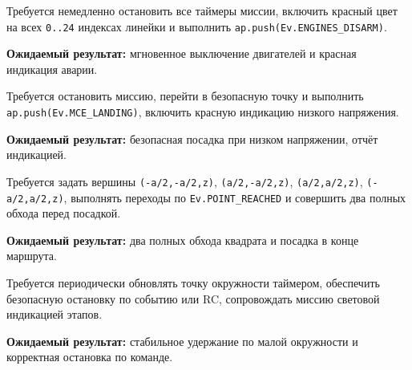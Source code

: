 \begin{taskbox}
Требуется немедленно остановить все таймеры миссии, включить красный цвет на всех \texttt{0..24} индексах линейки и выполнить \texttt{ap.push(Ev.ENGINES\_DISARM)}.

\textbf{Ожидаемый результат:} мгновенное выключение двигателей и красная индикация аварии.
\end{taskbox}

\begin{taskbox}
Требуется остановить миссию, перейти в безопасную точку и выполнить \texttt{ap.push(Ev.MCE\_LANDING)}, включить красную индикацию низкого напряжения.

\textbf{Ожидаемый результат:} безопасная посадка при низком напряжении, отчёт индикацией.
\end{taskbox}

\begin{taskbox}
Требуется задать вершины \texttt{(-a/2,-a/2,z)}, \texttt{(a/2,-a/2,z)}, \texttt{(a/2,a/2,z)}, \texttt{(-a/2,a/2,z)}, выполнять переходы по \texttt{Ev.POINT\_REACHED} и совершить два полных обхода перед посадкой.

\textbf{Ожидаемый результат:} два полных обхода квадрата и посадка в конце маршрута.
\end{taskbox}

\begin{taskbox}[«Лоитер» по малой окружности \texttt{r=0.2}]
Требуется периодически обновлять точку окружности таймером, обеспечить безопасную остановку по событию или RC, сопровождать миссию световой индикацией этапов.

\textbf{Ожидаемый результат:} стабильное удержание по малой окружности и корректная остановка по команде.
\end{taskbox}
